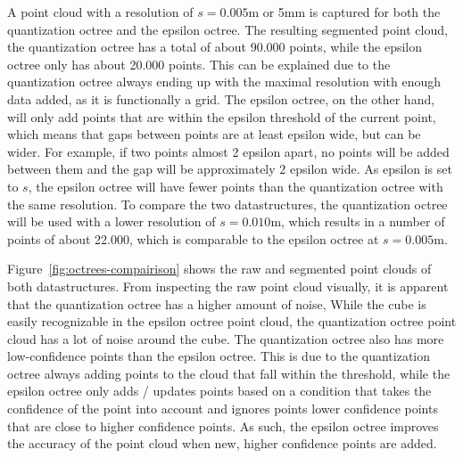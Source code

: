 A point cloud with a resolution of $s=0.005$m or 5mm is captured for both the quantization octree and the epsilon octree.
The resulting segmented point cloud, the quantization octree has a total of about 90.000 points,
while the epsilon octree only has about 20.000 points.
This can be explained due to the quantization octree always ending up with the maximal resolution
with enough data added, as it is functionally a grid.
The epsilon octree, on the other hand, will only add points that are within the epsilon threshold of the current point,
which means that gaps between points are at least epsilon wide, but can be wider.
For example, if two points almost 2 epsilon apart, no points will be added between them and the gap will be approximately
2 epsilon wide.
As epsilon is set to $s$, the epsilon octree will have fewer points than the quantization octree with the same resolution.
To compare the two datastructures, the quantization octree will be used with a lower resolution of $s=0.010$m,
which results in a number of points of about 22.000, which is comparable to the epsilon octree at $s=0.005$m.

Figure~\ref{fig:octrees-compairison} shows the raw and segmented point clouds of both datastructures.
From inspecting the raw point cloud visually, it is apparent that the quantization octree has a higher amount of noise,
While the cube is easily recognizable in the epsilon octree point cloud, the quantization octree point cloud has a lot of noise around the cube.
The quantization octree also has more low-confidence points than the epsilon octree.
This is due to the quantization octree always adding points to the cloud that fall within the threshold,
while the epsilon octree only adds / updates points based on a condition that takes the confidence of the point into account
and ignores points lower confidence points that are close to higher confidence points.
As such, the epsilon octree improves the accuracy of the point cloud when new, higher confidence points are added.


